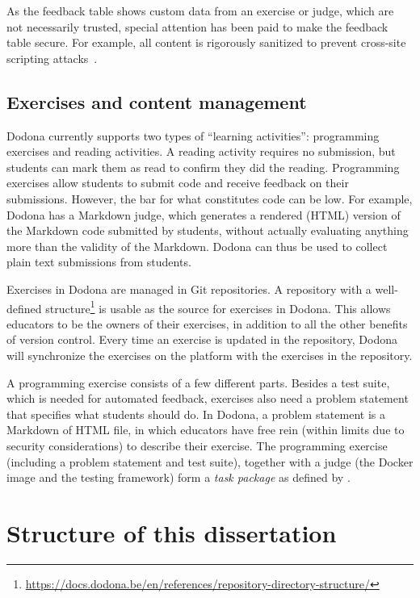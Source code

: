 \documentclass[../main]{subfiles}
\begin{document}
As the feedback table shows custom data from an exercise or judge, which are not necessarily trusted, special attention has been paid to make the feedback table secure.
For example, all content is rigorously sanitized to prevent cross-site scripting attacks~\autocite{guptaCrossSiteScriptingXSS2017}.

\subsection{Exercises and content management}\label{subsec:exercises-and-content-management}

Dodona currently supports two types of ``learning activities'': programming exercises and reading activities.
A reading activity requires no submission, but students can mark them as read to confirm they did the reading.
Programming exercises allow students to submit code and receive feedback on their submissions.
However, the bar for what constitutes code can be low.
For example, Dodona has a Markdown judge, which generates a rendered (HTML) version of the Markdown code submitted by students, without actually evaluating anything more than the validity of the Markdown.
Dodona can thus be used to collect plain text submissions from students.

Exercises in Dodona are managed in Git repositories.
A repository with a well-defined structure\footnote{\url{https://docs.dodona.be/en/references/repository-directory-structure/}} is usable as the source for exercises in Dodona.
This allows educators to be the owners of their exercises, in addition to all the other benefits of version control.
Every time an exercise is updated in the repository, Dodona will synchronize the exercises on the platform with the exercises in the repository.

A programming exercise consists of a few different parts.
Besides a test suite, which is needed for automated feedback, exercises also need a problem statement that specifies what students should do.
In Dodona, a problem statement is a Markdown of HTML file, in which educators have free rein (within limits due to security considerations) to describe their exercise.
The programming exercise (including a problem statement and test suite), together with a judge (the Docker image and the testing framework) form a \emph{task package} as defined by \textcite{verhoeffProgrammingTaskPackages2008}.

\section{Structure of this dissertation}\label{sec:a-note-on-the-structure-of-this-thesis}
\end{document}
